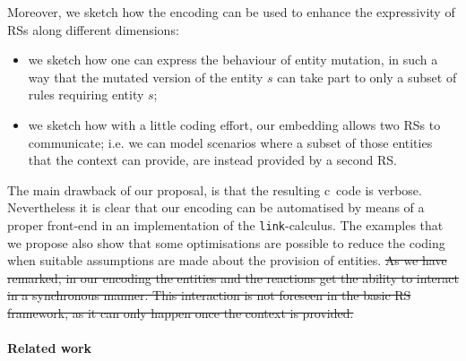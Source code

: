 Moreover, we sketch how the encoding can be used to enhance the expressivity of RSs along different dimensions:
\begin{itemize}
\item we sketch how one can express the behaviour of entity mutation,
in such a way that the mutated version of the entity
$s$ can  take part to only a subset of rules requiring entity $s$;
\item we sketch how with a little coding effort, our 
embedding
allows two RSs to
communicate; i.e. we can model scenarios where a subset of those entities that the context  can
provide, are instead provided by a second RS.
\end{itemize}

The main drawback of our proposal, is that the resulting c\CNA \ 
code
is
verbose. Nevertheless it is clear that our
encoding
can be automatised by means of a proper front-end in
an implementation of the {\tt link}-calculus. 
The examples that we propose also show that some optimisations are possible
to reduce the coding when suitable assumptions are made about the provision of entities.
{\color{red}
\st{ As we have remarked, in our 
encoding
the entities and the reactions
get the ability to interact in a synchronous manner. 
This interaction is not foreseen in
the basic RS framework, as it can only happen once the context is provided.}}


\paragraph{Related work}

